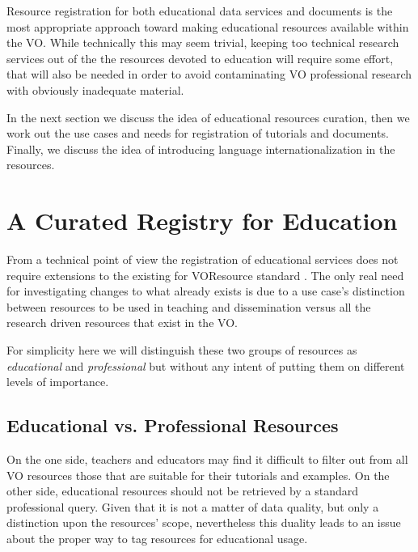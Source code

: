 \documentclass{ivoa}
\begin{document}
Resource registration for both educational data services and documents 
is the most appropriate approach toward making educational resources 
available within the VO.  While
technically this may seem trivial, keeping too technical
research services out of the the resources devoted to education will
require some effort, that will also be needed in order to avoid contaminating 
VO professional research with obviously inadequate material.

In the next section we discuss the idea of educational resources curation, then 
we work out the use cases and needs for
registration of tutorials and documents. Finally, we discuss the idea of introducing language
internationalization in the resources.



\section{A Curated Registry for Education}

\label{sect:curreg}


From a technical point of view the registration of educational services
does not require extensions
to the existing for VOResource standard \citep{2008ivoa.spec.0222P}.
The only real need for investigating changes to what already exists is due to a
use case's distinction between resources to be used in teaching and dissemination
versus all the research driven resources that exist in the VO.



For simplicity here we will distinguish these two groups of resources as
\emph{educational}
 and 
\emph{professional}
 but without any intent of putting them
on different levels of importance.



\subsection{Educational vs. Professional Resources}

\label{sect:eduvspro}


On the one side, teachers and educators may find it difficult to filter out 
from all VO resources those that are suitable for their tutorials and
examples. On the other side, educational resources should not be retrieved 
by a standard professional query.
Given that it is not a matter of data quality, but only a distinction upon 
the resources' scope, nevertheless this duality leads to an issue about the
proper way to tag resources for educational usage.
  
\end{document}
